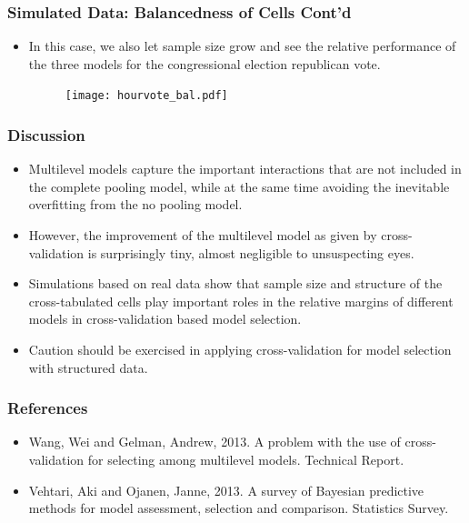 \documentclass[xetex,mathserif,serif]{beamer}
\begin{document}
\begin{frame}
  \frametitle{Simulated Data: Balancedness of Cells Cont'd}
  \begin{itemize}
  \item In this case, we also let sample size grow and see the relative
    performance of the three models for the congressional election republican
    vote.
    \begin{figure}[htbp]
      \centering
      \texttt{[image: hourvote\_bal.pdf]}
    \end{figure}
  \end{itemize}
\end{frame}

\begin{frame}
  \frametitle{Discussion}
  \begin{itemize}
  \item Multilevel models capture the important interactions that are not included
    in the complete pooling model, while at the same time avoiding the inevitable
    overfitting from the no pooling model.  
  \item However, the improvement of the multilevel model as given by
    cross-validation is surprisingly tiny, almost negligible to unsuspecting
    eyes.
  \item Simulations based on real data show that sample size and structure of the
    cross-tabulated cells play important roles in the relative margins of
    different models in cross-validation based model selection.
  \item Caution should be exercised in applying cross-validation for model
    selection with structured data.
  \end{itemize}  
\end{frame}

\begin{frame}
  \frametitle{References}
  \begin{itemize}
  \item Wang, Wei and Gelman, Andrew, 2013. A problem with the use of
    cross-validation for selecting among multilevel models. Technical Report.  
  \item Vehtari, Aki and Ojanen, Janne, 2013. A survey of Bayesian predictive
    methods for model assessment, selection and comparison. Statistics Survey.
  \end{itemize}
\end{frame}
\end{document}
